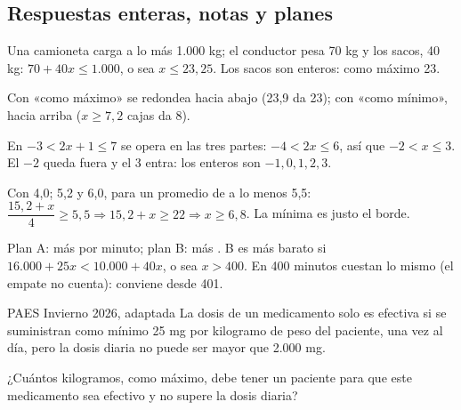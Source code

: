 \subsection{Respuestas enteras, notas y planes}
\begin{ejemplo} Una camioneta carga a lo más 1.000 kg; el conductor pesa 70 kg y los sacos, 40 kg: $70 + 40x \leq 1.000$, o sea $x \leq 23{,}25$. Los sacos son enteros: como máximo 23.\end{ejemplo}
\begin{ojo} Con «como máximo» se redondea hacia abajo (23,9 da 23); con «como mínimo», hacia arriba ($x \geq 7{,}2$ cajas da 8).\end{ojo}
\begin{ejemplo} En $-3 < 2x + 1 \leq 7$ se opera en las tres partes: $-4 < 2x \leq 6$, así que $-2 < x \leq 3$. El $-2$ queda fuera y el 3 entra: los enteros son $-1, 0, 1, 2, 3$.\par\smallskip
\centering{}\end{ejemplo}
\begin{ejemplo} Con 4,0; 5,2 y 6,0, para un promedio de a lo menos 5,5: $\dfrac{15{,}2 + x}{4} \geq 5{,}5 \Rightarrow 15{,}2 + x \geq 22 \Rightarrow x \geq 6{,}8$. La mínima es justo el borde.\end{ejemplo}
\begin{ejemplo} Plan A:  más  por minuto; plan B:  más . B es más barato si $16.000 + 25x < 10.000 + 40x$, o sea $x > 400$. En 400 minutos cuestan lo mismo (el empate no cuenta): conviene desde 401.\end{ejemplo}

\begin{elejemplo}{PAES Invierno 2026, adaptada}
La dosis de un medicamento solo es efectiva si se suministran como mínimo 25 mg por kilogramo de peso del paciente, una vez al día, pero la dosis diaria no puede ser mayor que 2.000 mg.

¿Cuántos kilogramos, como máximo, debe tener un paciente para que este medicamento sea efectivo y no supere la dosis diaria?
\end{elejemplo}

